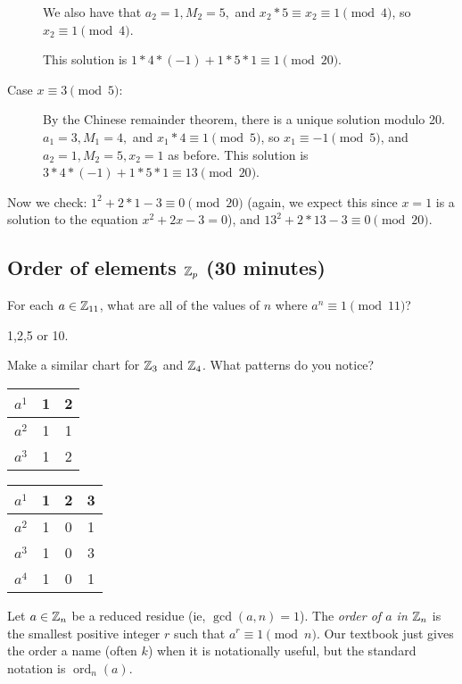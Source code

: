 \documentclass[letterpaper, 11 pt]{article}
\begin{document}
\begin{example}
\begin{description}
 
 We also have that $a_2=1, M_2=5,$ and $x_2*5\equiv x_2\equiv1\pmod 4$, so $x_2\equiv 1 \pmod 4$.
 
 This solution is $1*4*(-1)+1*5*1\equiv 1 \pmod {20}$.
 \item [Case $x\equiv 3 \pmod 5$:] By the Chinese remainder theorem, there is a unique solution modulo 20. $a_1=3, M_1=4,$ and $x_1*4\equiv 1 \pmod 5$, so $x_1\equiv -1 \pmod 5$, and $a_2=1, M_2=5, x_2=1$ as before. This solution is $3*4*(-1)+1*5*1\equiv 13 \pmod {20}$.
\end{description}
Now we check: $1^2+2*1-3\equiv 0\pmod{20}$ (again, we expect this since $x=1$ is a solution to the equation $x^2+2x-3=0$), and $13^2+2*13-3\equiv 0\pmod{20}$.
\end{example}


\subsection{Order of elements $\mathbb Z_p$ (30 minutes)}
\begin{poll}
For each $a\in \mathbb Z_{11}$, what are all of the values of $n$ where $a^n\equiv 1 \pmod{11}$?
\end{poll}
\begin{solution}
 1,2,5 or 10.
\end{solution}
\begin{br}[5 minutes]
 Make a similar chart for $\mathbb Z_3$ and $\mathbb Z_4$. What patterns do you notice?
\end{br}
\begin{solution}
 
\begin{tabular}{|c||c|c|}\hline
 $a^1$ & 1& 2\\\hline\hline
 $a^2$ & 1 & 1\\\hline
 $a^3$ & 1 & 2\\\hline
\end{tabular}
\quad\quad
\begin{tabular}{|c||c|c|c|}\hline
 $a^1$ & 1& 2 & 3\\\hline\hline
 $a^2$ & 1 & 0 & 1\\\hline
 $a^3$ & 1 & 0 & 3\\\hline
 $a^4$ & 1 & 0 & 1\\\hline
\end{tabular}
\end{solution}

\begin{defn}
 Let $a\in\mathbb Z_n$ be a reduced residue (ie, $\gcd(a,n)=1$). The \emph{order of $a$ in $\mathbb Z_n$} is the smallest positive integer $r$ such that $a^r\equiv 1 \pmod{n}$. Our textbook just gives the order a name (often $k$) when it is notationally useful, but the standard notation is $\operatorname{ord}_n(a)$. 
\end{defn}
\end{document}
